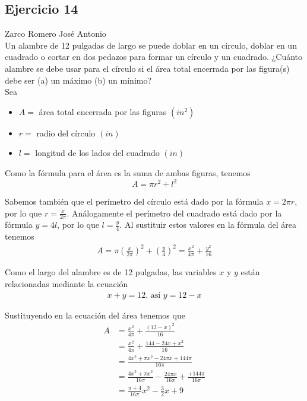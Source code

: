 \documentclass[12pt]{article}
\begin{document}
\subsection{Ejercicio 14} Zarco Romero José Antonio \\

Un alambre de 12 pulgadas de largo se puede doblar en un círculo, doblar en un cuadrado o cortar en dos pedazos para formar un círculo y un cuadrado. ¿Cuánto alambre se debe usar para el círculo si el área total encerrada por las figura(s) debe ser (a) un máximo (b) un mínimo? \\

Sea
\begin{itemize}
\item $A= $ área total encerrada por las figuras $(in^2)$
\item $r= $ radio del círculo $(in)$
\item $l= $ longitud de los lados del cuadrado $(in)$
\end{itemize}

Como la fórmula para el área es la suma de ambas figuras, tenemos
\[
A=\pi r^2 + l^2
\]

Sabemos también que el perímetro del círculo está dado por la fórmula $x=2\pi r$, por lo que $r=\frac{x}{2\pi}$. Análogamente el perímetro del cuadrado está dado por la fórmula $y=4l$, por lo que $l=\frac{y}{4}$. Al sustituir estos valores en la fórmula del área tenemos
\begin{align*}
  A
  = \pi \left( \frac{x}{2\pi} \right)^2 + \left( \frac{y}{4} \right)^2
  = \frac{x^2}{4\pi}+\frac{y^2}{16}
\end{align*}

Como el largo del alambre es de 12 pulgadas, las variables $x$ y $y$ están relacionadas mediante la ecuación
\begin{align*}
  x+y=12 \text{, así } y=12-x
\end{align*}

Sustituyendo en la ecuación del área tenemos que
\begin{align*}
  A
  &= \frac{x^2}{4\pi}+\frac{(12-x)^2}{16} \\
  &= \frac{x^2}{4\pi}+\frac{144-24x+x^2}{16} \\
  &= \frac{4x^2+\pi x^2-24\pi x +144\pi}{16\pi} \\
  &= \frac{4x^2+\pi x^2}{16\pi} - \frac{24\pi x }{16\pi} + \frac{+144\pi}{16\pi}\\
  &= \frac{\pi + 4}{16\pi}x^2-\frac{3}{2}x+9
\end{align*}
\end{document}

